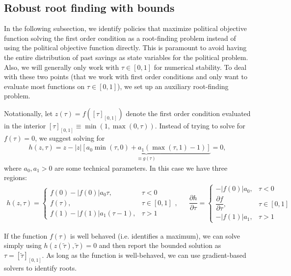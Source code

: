 \documentclass[a4paper]{article}
\begin{document}
\subsection{Robust root finding with bounds}\label{\refsec:RobustRoot}
In the following subsection, we identify policies that maximize political objective function solving the first order condition as a root-finding problem instead of using the political objective function directly. This is paramount to avoid having the entire distribution of past savings as state variables for the political problem. Also, we will generally only work with $\tau \in[0,1]$ for numerical stability. To deal with these two points (that we work with first order conditions and only want to evaluate most functions on $\tau\in[0,1]$), we set up an auxiliary root-finding problem. 

Notationally, let $z(\tau) = f\left([\tau]_{[0,1]}\right)$ denote the first order condition evaluated in the interior $[\tau]_{[0,1]} \equiv \min(1, \max(0,\tau))$. Instead of trying to solve for $f(\tau) = 0$, we suggest solving for 
\begin{align}\label{\refeq:root}
    h(z,\tau) = z - |z| \underbrace{\left[a_0\min\left(\tau,0\right) + a_1\left(\max(\tau,1)-1\right)\right]}_{\equiv g(\tau)} = 0,
\end{align}
where $a_0, a_1>0$ are some technical parameters. In this case we have three regions:
\begin{align*}
    h\left(z,\tau\right) = \left\lbrace \begin{array}{ll} f(0)-|f(0)| a_0 \tau, & \tau<0 \\
    f(\tau), & \tau\in[0,1] \\ 
    f(1)-|f(1)|a_1(\tau-1), & \tau>1\end{array}\right., && \dfrac{\partial h}{\partial \tau} = \left\lbrace \begin{array}{ll} -|f(0)|a_0, & \tau<0 \\
    \dfrac{\partial f}{\partial \tau}, & \tau\in[0,1] \\ 
    -|f(1)|a_1, & \tau>1\end{array}\right.
\end{align*}


If the function $f(\tau)$ is well behaved (i.e. identifies a maximum), we can solve simply using $h(z(\tilde{\tau}), \tilde{\tau}) = 0$ and then report the bounded solution as $\tau = [\tilde{\tau}]_{[0,1]}$. As long as the function is well-behaved, we can use gradient-based solvers to identify roots. 
\end{document}
